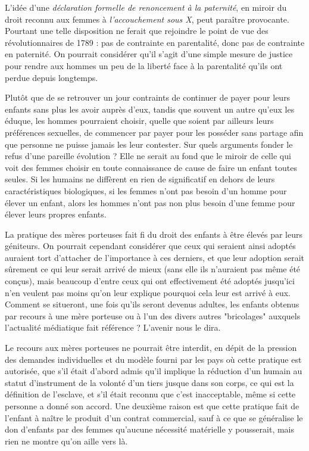  L'idée d'une {\emph{déclaration formelle de renoncement à la paternité}}, en miroir du droit reconnu aux femmes à \emph{l'accouchement sous X}, peut paraître provocante. Pourtant une telle disposition ne ferait que rejoindre le point de vue des révolutionnaires de 1789 : pas de contrainte en parentalité, donc pas de contrainte en paternité. On pourrait considérer qu'il s'agit d'une simple mesure de justice pour rendre aux hommes un peu de la liberté face à la parentalité qu'ils ont perdue depuis longtemps.

 Plutôt que de se retrouver un jour contraints de continuer de payer pour leurs enfants sans plus les avoir auprès d'eux, tandis que souvent un autre qu'eux les éduque, les hommes pourraient choisir, quelle que soient par ailleurs leurs préférences sexuelles, de commencer par payer pour les posséder sans partage afin que personne ne puisse jamais les leur contester. Sur quels arguments fonder le refus d'une pareille évolution ? Elle ne serait au fond que le miroir de celle qui voit des femmes choisir en toute connaissance de cause de faire un enfant toutes seules. Si les humains ne diffèrent en rien de significatif en dehors de leurs caractéristiques biologiques, si les femmes n'ont pas besoin d'un homme pour élever un enfant, alors les hommes n'ont pas non plus besoin d'une femme pour élever leurs propres enfants.
 
 La pratique des mères porteuses fait fi du droit des enfants à être élevés par leurs géniteurs. On pourrait cependant considérer que ceux qui seraient ainsi adoptés auraient tort d'attacher de l'importance à ces derniers, et que leur adoption serait sûrement ce qui leur serait arrivé de mieux (sans elle ils n'auraient pas même été conçus), mais beaucoup d'entre ceux qui ont effectivement été adoptés jusqu'ici n'en veulent pas moins qu'on leur explique pourquoi cela leur est arrivé à eux. Comment se situeront, une fois qu'ils seront devenus adultes, les enfants obtenus par recours à une mère porteuse ou à l'un des divers autres "bricolages" auxquels l'actualité médiatique fait référence ? L'avenir nous le dira.   

 Le recours aux mères porteuses ne pourrait être interdit, en dépit de la pression des demandes individuelles et du modèle fourni par les pays où cette pratique est autorisée, que s'il était d'abord admis qu'il implique la réduction d'un humain au statut d'instrument de la volonté d'un tiers jusque dans son corps, ce qui est la définition de l'esclave, et s'il était reconnu que c'est inacceptable, même si cette personne a donné son accord. Une deuxième raison est que cette pratique fait de l'enfant à naître le produit d'un contrat commercial, sauf à ce que se généralise le don d'enfants par des femmes qu'aucune nécessité matérielle y pousserait, mais rien ne montre qu'on aille vers là.
  
